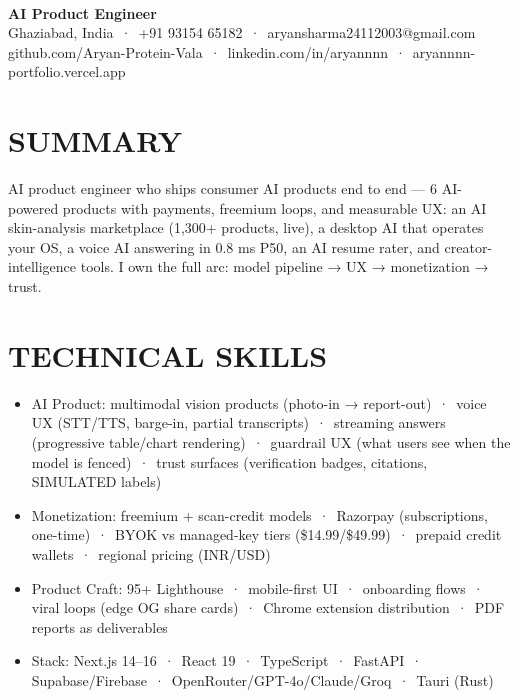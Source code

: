 \documentclass[9pt]{article}
\begin{document}
\\[3pt]
{\large\bfseries AI Product Engineer}\\[3pt]
{\small\color{greyc} Ghaziabad, India \,·\, +91 93154 65182 \,·\, aryansharma24112003@gmail.com}\vspace{-2pt}
{\small\color{greyc} github.com/Aryan-Protein-Vala \,·\, linkedin.com/in/aryannnn \,·\, aryannnn-portfolio.vercel.app}\vspace{-2pt}
\section*{SUMMARY}
AI product engineer who ships consumer AI products end to end  ---  6 AI-powered products with payments, freemium loops, and measurable UX: an AI skin-analysis marketplace (1,300+ products, live), a desktop AI that operates your OS, a voice AI answering in 0.8 ms P50, an AI resume rater, and creator-intelligence tools. I own the full arc: model pipeline → UX → monetization → trust.
\vspace{1pt}
\section*{TECHNICAL SKILLS}
\begin{itemize}[leftmargin=11pt,itemsep=0pt,topsep=1pt,parsep=0pt]
\item AI Product: multimodal vision products (photo-in → report-out) \,·\, voice UX (STT/TTS, barge-in, partial transcripts) \,·\, streaming answers (progressive table/chart rendering) \,·\, guardrail UX (what users see when the model is fenced) \,·\, trust surfaces (verification badges, citations, SIMULATED labels)
\item Monetization: freemium + scan-credit models \,·\, Razorpay (subscriptions, one-time) \,·\, BYOK vs managed-key tiers (\$14.99/\$49.99) \,·\, prepaid credit wallets \,·\, regional pricing (INR/USD)
\item Product Craft: 95+ Lighthouse \,·\, mobile-first UI \,·\, onboarding flows \,·\, viral loops (edge OG share cards) \,·\, Chrome extension distribution \,·\, PDF reports as deliverables
\item Stack: Next.js 14–16 \,·\, React 19 \,·\, TypeScript \,·\, FastAPI \,·\, Supabase/Firebase \,·\, OpenRouter/GPT-4o/Claude/Groq \,·\, Tauri (Rust)
\end{itemize}
\end{document}
